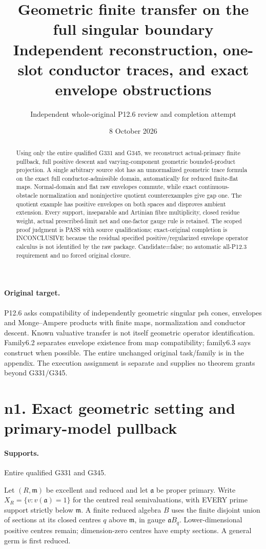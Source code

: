 \documentclass[11pt]{article}
\title{Geometric finite transfer on the full singular boundary\\Independent reconstruction, one-slot conductor traces, and exact envelope obstructions}
\author{Independent whole-original P12.6 review and completion attempt}
\date{8 October 2026}
\begin{document}
\maketitle
\begin{abstract}
Using only the entire qualified G331 and G345, we reconstruct actual-primary finite pullback, full positive descent and varying-component geometric bounded-product projection. A single arbitrary source slot has an unnormalized geometric trace formula on the exact full conductor-admissible domain, automatically for reduced finite-flat maps. Normal-domain and flat raw envelopes commute, while exact continuous-obstacle normalization and noninjective quotient counterexamples give gap one. The quotient example has positive envelopes on both spaces and disproves ambient extension. Every support, inseparable and Artinian fibre multiplicity, closed residue weight, actual prescribed-limit net and one-factor gauge rule is retained. The scoped proof judgment is PASS with source qualifications; exact-original completion is INCONCLUSIVE because the residual specified positive/regularized envelope operator calculus is not identified by the raw package. Candidate=false; no automatic all-P12.3 requirement and no forced original closure.
\end{abstract}
\paragraph{Original target.} P12.6 asks compatibility of independently geometric singular psh cones, envelopes and Monge--Ampere products with finite maps, normalization and conductor descent. Known valuative transfer is not itself geometric operator identification. Family6.2 separates envelope existence from map compatibility; family6.3 says construct when possible. The entire unchanged original task/family is in the appendix. The execution assignment is separate and supplies no theorem grants beyond G331/G345.
\tableofcontents\newpage
\section{n1. Exact geometric setting and primary-model pullback}
\paragraph{Supports.} Entire qualified G331 and G345.

Let $(R,\mathfrak m)$ be excellent and reduced and let $\mathfrak a$ be proper primary. Write $X_R=\{v:v(\mathfrak a)=1\}$ for the centred real semivaluations, with EVERY prime support strictly below $\mathfrak m$. A finite reduced algebra $B$ uses the finite disjoint union of sections at its closed centres $q$ above $\mathfrak m$, in gauge $\mathfrak aB_q$. Lower-dimensional positive centres remain; dimension-zero centres have empty sections. A general germ is first reduced.
\end{document}
